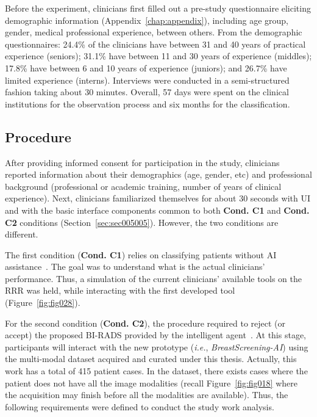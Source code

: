 Before the experiment, clinicians first filled out a pre-study questionnaire eliciting demographic information (Appendix~\ref{chap:appendix}), including age group, gender, medical professional experience, between others.
From the demographic questionnaires:
24.4\% of the clinicians have between 31 and 40 years of practical experience (seniors);
31.1\% have between 11 and 30 years of experience (middles);
17.8\% have between 6 and 10 years of experience (juniors); and
26.7\% have limited experience (interns).
Interviews were conducted in a semi-structured fashion taking about 30 minutes.
Overall, 57 days were spent on the clinical institutions for the observation process and six months for the classification.

\subsection{Procedure}
\label{sec:sec005005002}

After providing informed consent for participation in the study, clinicians reported information about their demographics (age, gender, etc) and professional background (professional or academic training, number of years of clinical experience).
Next, clinicians familiarized themselves for about 30 seconds with \ac{UI} and with the basic interface components common to both {\bf Cond. C1} and {\bf Cond. C2} conditions (Section~\ref{sec:sec005005}).
However, the two conditions are different.

The first condition ({\bf Cond. C1}) relies on classifying patients without \ac{AI} assistance~\cite{10.1145/3399715.3399744}.
The goal was to understand what is the actual clinicians' performance.
Thus, a simulation of the current clinicians' available tools on the \ac{RRR} was held, while interacting with the first developed tool (Figure~\ref{fig:fig028}).

For the second condition ({\bf Cond. C2}), the procedure required to reject (or accept) the proposed \ac{BI-RADS} provided by the intelligent agent~\cite{https://doi.org/10.13140/rg.2.2.16566.14403/1}.
At this stage, participants will interact with the new prototype ({\it i.e.}, {\it BreastScreening-AI}) using the multi-modal dataset acquired and curated under this thesis.
Actually, this work has a total of 415 patient cases.
In the dataset, there exists cases where the patient does not have all the image modalities (recall Figure~\ref{fig:fig018} where the acquisition may finish before all the modalities are available).
Thus, the following requirements were defined to conduct the study work analysis.

